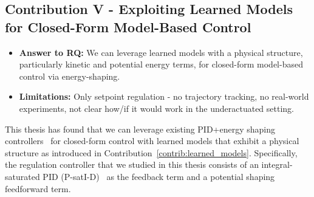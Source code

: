 \subsection{Contribution V - Exploiting Learned Models for Closed-Form Model-Based Control}
\begin{itemize}
    \item \textbf{Answer to RQ:} We can leverage learned models with a physical structure, particularly kinetic and potential energy terms, for closed-form model-based control via energy-shaping.
    \item \textbf{Limitations:} Only setpoint regulation - no trajectory tracking, no real-world experiments, not clear how/if it would work in the underactuated setting.
\end{itemize}
This thesis has found that we can leverage existing PID+energy shaping controllers~\citep{kelly1995tuning, kelly1996class, kelly1998global, sciavicco2012modelling, della2023model} for closed-form control with learned models that exhibit a physical structure as introduced in Contribution~\ref{contrib:learned_models}.
Specifically, the regulation controller that we studied in this thesis consists of an integral-saturated PID (P-satI-D)~\citep{pustina2022p} as the feedback term and a potential shaping feedforward term.


